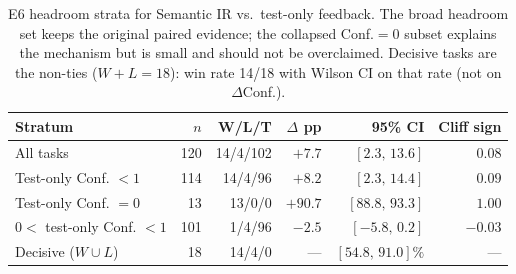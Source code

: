 \begin{table}[t]
  \centering
  \caption{E6 headroom strata for Semantic IR vs.\ test-only feedback.
    The broad headroom set keeps the original paired evidence; the collapsed
    Conf.$=0$ subset explains the mechanism but is small and should not be
    overclaimed.
    Decisive tasks are the non-ties ($W{+}L{=}18$): win rate 14/18 with Wilson
    CI on that rate (not on $\Delta$Conf.).}
  \label{tab:e6-headroom}
  \footnotesize
  \renewcommand{\arraystretch}{1.08}
  \begin{tabular}{@{}lrrrrr@{}}
    \toprule
    Stratum & $n$ & W/L/T & $\Delta$ pp & 95\% CI & Cliff sign \\
    \midrule
    All tasks
      & 120 & 14/4/102 & $+7.7$ & $[2.3,\,13.6]$ & $0.08$ \\
    Test-only Conf. $<1$
      & 114 & 14/4/96 & $+8.2$ & $[2.3,\,14.4]$ & $0.09$ \\
    Test-only Conf. $=0$
      & 13 & 13/0/0 & $+90.7$ & $[88.8,\,93.3]$ & $1.00$ \\
    $0<$ test-only Conf. $<1$
      & 101 & 1/4/96 & $-2.5$ & $[-5.8,\,0.2]$ & $-0.03$ \\
    Decisive ($W\cup L$)
      & 18 & 14/4/0 & --- & $[54.8,\,91.0]\%$ & --- \\
    \bottomrule
  \end{tabular}
\end{table}
